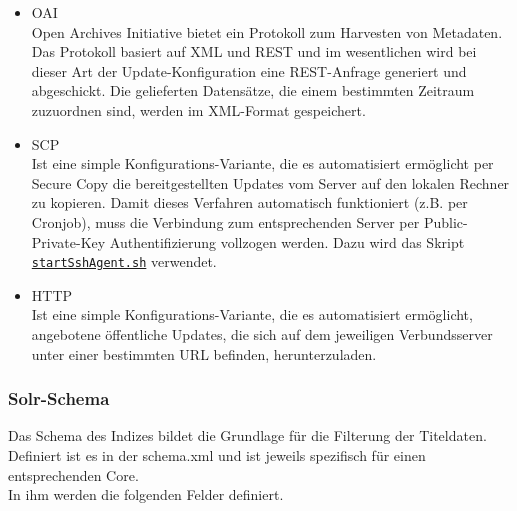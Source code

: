 \documentclass[10pt]{article}
\begin{document}
\begin{itemize}
	\item OAI \\
		Open Archives Initiative bietet ein Protokoll zum Harvesten von Metadaten. Das Protokoll basiert auf XML und REST und im wesentlichen wird bei dieser Art der Update-Konfiguration eine REST-Anfrage generiert und abgeschickt. Die gelieferten Datensätze, die einem bestimmten Zeitraum zuzuordnen sind, werden im XML-Format gespeichert.
	\item SCP \\ 
		Ist eine simple Konfigurations-Variante, die es automatisiert ermöglicht per Secure Copy die bereitgestellten Updates vom Server auf den lokalen Rechner zu kopieren. Damit dieses Verfahren automatisch funktioniert (z.B. per Cronjob), muss die Verbindung zum entsprechenden Server per Public-Private-Key Authentifizierung vollzogen werden. Dazu wird das Skript \hyperref[sec:para:startSshAgent]{\texttt{startSshAgent.sh}} verwendet.
	\item HTTP \\
		Ist eine simple Konfigurations-Variante, die es automatisiert ermöglicht, angebotene öffentliche Updates, die sich auf dem jeweiligen Verbundsserver unter einer bestimmten URL befinden, herunterzuladen.
\end{itemize}

\subsubsection{Solr-Schema}
Das Schema des Indizes bildet die Grundlage für die Filterung der Titeldaten. Definiert ist es in der schema.xml und ist jeweils spezifisch für einen entsprechenden Core. \\
In ihm werden die folgenden Felder definiert. 
\end{document}
